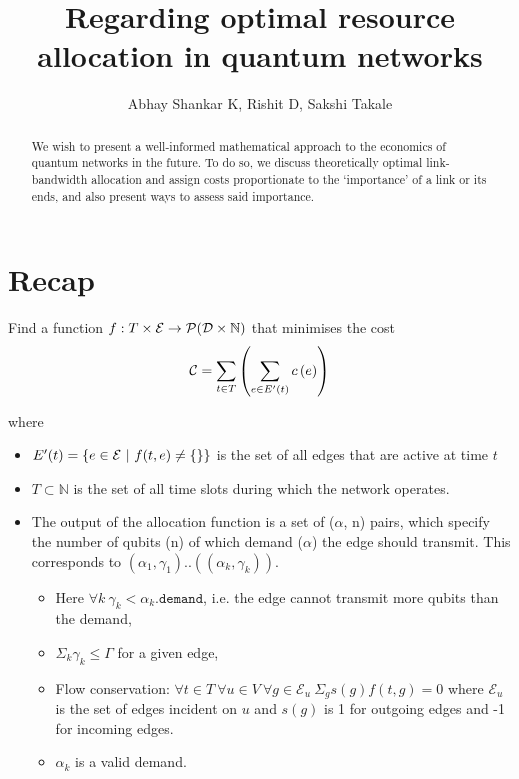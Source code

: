 \documentclass{amsart}
\begin{document}
    \title{ Regarding optimal resource allocation in quantum networks }
    \begin{abstract}
        We wish to present a well-informed mathematical approach to the economics of quantum networks in the future. To do so, we discuss theoretically optimal link-bandwidth allocation and assign costs proportionate to the `importance' of a link or its ends, and also present ways to assess said importance.
    \end{abstract}
    \author{Abhay Shankar K, Rishit D, Sakshi Takale}
    \maketitle

    \section{Recap}

    Find a function \(f : T \times \mathcal{E} \rightarrow \mathcal{P}(\mathcal{D \times \mathbb{N}})\) that minimises the cost 
        \[\mathcal{C} = \sum_{t \in T} \left(\sum_{e \in E'(t)} c\left(e\right)\right)\]


    where \begin{itemize}
        \item \(E'(t) = \left\{e \in \mathcal{E} \ |\  f(t, e) \neq \{\} \right\}\) is the set of all edges that are active at time \(t\)
        \item \(T \subset \mathbb{N}\) is the set of all time slots during which the network operates.
        \item The output of the allocation function is a set of (\(\alpha\), n) pairs, which specify the number of qubits (n) of which demand (\(\alpha\)) the edge should transmit. This corresponds to \((\alpha_1, \gamma_1)..((\alpha_k, \gamma_k))\).
         \begin{itemize}
            \item  Here \(\forall k\ \gamma_k < \alpha_k\texttt{.demand}\), i.e. the edge cannot transmit more qubits than the demand,
            \item \(\Sigma_k \gamma_k \leq \Gamma\) for a given edge, 
            \item Flow conservation: \(\forall t \in T\ \forall u \in V\ \forall g \in \mathcal{E}_u\  \Sigma_g s(g)f(t, g) = 0\) where \(\mathcal{E}_u\) is the set of edges incident on \(u\) and \(s(g)\) is 1 for outgoing edges and -1 for incoming edges.
            \item \(\alpha_k\) is a valid demand.
        \end{itemize}
    \end{itemize}
\end{document}
